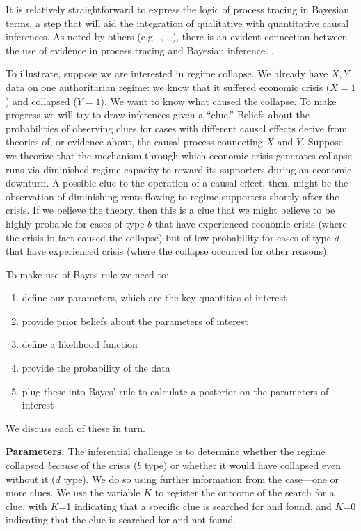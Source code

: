 \documentclass[12pt,]{book}
\providecommand{\tightlist}{%
  \setlength{\itemsep}{0pt}\setlength{\parskip}{0pt}}
\begin{document}
It is relatively straightforward to express the logic of process tracing in Bayesian terms, a step that will aid the integration of qualitative with quantitative causal inferences. As noted by others (e.g.~\citet{BennettBayes}, \citet{beachpedersen2013process}, \citet{rohlfing2012case}), there is an evident connection between the use of evidence in process tracing and Bayesian inference. .

To illustrate, suppose we are interested in regime collapse. We already have \(X,Y\) data on one authoritarian regime: we know that it suffered economic crisis (\(X=1\)) and collapsed (\(Y=1\)). We want to know what caused the collapse. To make progress we will try to draw inferences given a ``clue.'' Beliefs about the probabilities of observing clues for cases with different causal effects derive from theories of, or evidence about, the causal process connecting \(X\) and \(Y\). Suppose we theorize that the mechanism through which economic crisis generates collapse runs via diminished regime capacity to reward its supporters during an economic downturn. A possible clue to the operation of a causal effect, then, might be the observation of diminishing rents flowing to regime supporters shortly after the crisis. If we believe the theory, then this is a clue that we might believe to be highly probable for cases of type \(b\) that have experienced economic crisis (where the crisis in fact caused the collapse) but of low probability for cases of type \(d\) that have experienced crisis (where the collapse occurred for other reasons).

To make use of Bayes rule we need to:

\begin{enumerate}
\def\labelenumi{\arabic{enumi}.}
\tightlist
\item
  define our parameters, which are the key quantities of interest
\item
  provide prior beliefs about the parameters of interest
\item
  define a likelihood function
\item
  provide the probability of the data
\item
  plug these into Bayes' rule to calculate a posterior on the parameters of interest
\end{enumerate}

We discuss each of these in turn.

\textbf{Parameters.} The inferential challenge is to determine whether the regime collapsed \emph{because} of the crisis (\(b\) type) or whether it would have collapsed even without it (\(d\) type). We do so using further information from the case---one or more clues. We use the variable \(K\) to register the outcome of the search for a clue, with \(K\)=1 indicating that a specific clue is searched for and found, and \(K\)=0 indicating that the clue is searched for and not found.
\end{document}
